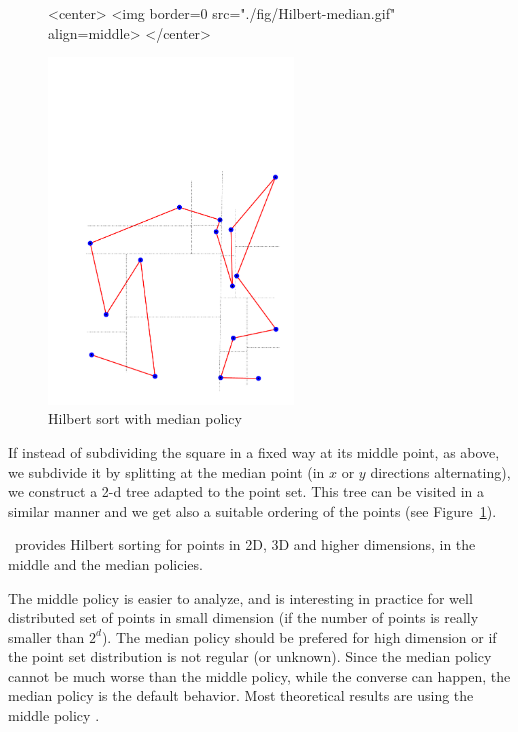 \begin{figure}[t]
\begin{ccHtmlOnly}
<center>
<img border=0 src="./fig/Hilbert-median.gif" align=middle>
</center>
\end{ccHtmlOnly} 
\begin{ccTexOnly}
\begin{center}
\includegraphics[width=6.5cm]{Spatial_sorting/fig/Hilbert-median}
\end{center}
\end{ccTexOnly}
\caption{Hilbert sort with median policy
\label{Spatial_sorting_fig_Hilbert_median}}
\end{figure}

If instead of subdividing the square in a fixed way at its middle point,
 as above, we subdivide it
by splitting at the median point (in $x$ or $y$ directions alternating),
we construct a 2-d tree adapted to the point set. This tree can be visited in a
similar manner and we get also a suitable ordering of the points
(see Figure~\ref{Spatial_sorting_fig_Hilbert_median}).






\cgal\ provides Hilbert sorting for points in 2D, 3D and higher dimensions,
in the middle and the median policies.

The middle policy is easier to analyze, and is interesting in practice
for well distributed set of points in small dimension (if the number
of points is really smaller than $2^d$).
The median policy should be prefered for high dimension or if 
the point set distribution is not regular (or unknown).
Since the median policy cannot be much worse than the middle
policy, while the converse can happen, the median policy is the
default behavior.
Most theoretical results are using the middle policy
\cite{acr-icb-03,other-references}.


